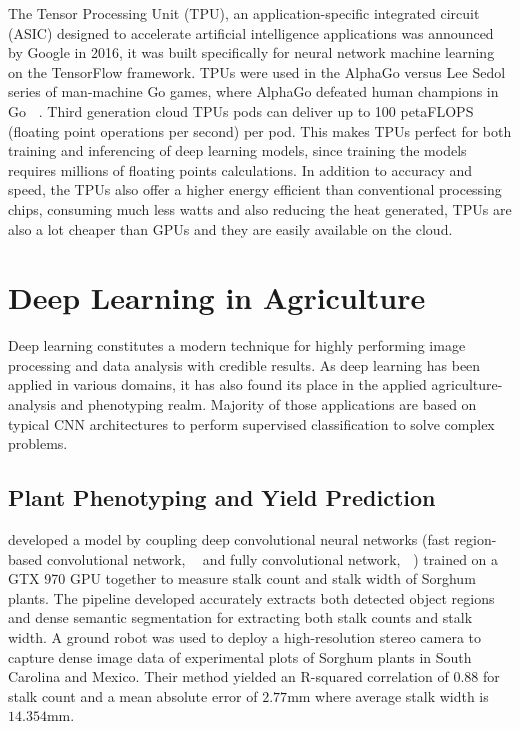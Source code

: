 \documentclass[12pt]{report}
\numberwithin{equation}{section}
\begin{document}
The Tensor Processing Unit (TPU), an application-specific integrated circuit (ASIC) designed to accelerate artificial intelligence applications was announced by Google in 2016, it was built specifically for neural network machine learning on the TensorFlow framework. TPUs were used in the AlphaGo versus Lee Sedol series of man-machine Go games, where AlphaGo defeated human champions in Go \textbf{~\cite{Silver_2016}}. Third generation cloud TPUs pods can deliver up to 100 petaFLOPS (floating point operations per second) per pod. This makes TPUs perfect for both training and inferencing of deep learning models, since training the models requires millions of floating points calculations. In addition to accuracy and speed, the TPUs also offer a higher energy efficient than conventional processing chips, consuming much less watts and also reducing the heat generated, TPUs are also a lot cheaper than GPUs and they are easily available on the cloud.

\section{Deep Learning in Agriculture}
Deep learning constitutes a modern technique for highly performing image processing and data analysis with credible results.  As deep learning has been applied in various domains, it has also found its place in the applied agriculture-analysis and phenotyping realm. Majority of those applications are based on typical CNN architectures to perform supervised classification to solve complex problems.
\subsection{Plant Phenotyping and Yield Prediction}
\textbf{\cite{10.1007/978-3-319-67361-5_18}} developed a model by coupling deep convolutional neural networks (fast region-based convolutional network, \textbf{~\cite{DBLP:journals/corr/Girshick15}} and fully convolutional network, \textbf{~\cite{DBLP:journals/corr/LongSD14}}) trained on a GTX 970 GPU together to measure stalk count and stalk width of Sorghum plants. The pipeline developed accurately extracts both detected object regions and dense semantic segmentation for extracting both stalk counts and stalk width. A ground robot was used to deploy a high-resolution stereo camera to capture dense image data of experimental plots of Sorghum plants in South Carolina and Mexico. Their method yielded an R-squared correlation of $0.88$ for stalk count and a mean absolute error of $2.77$mm where average stalk width is $14.354$mm. 
\end{document}
